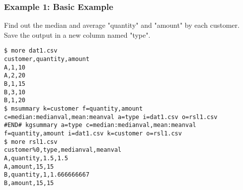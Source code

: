 \subsubsection*{Example 1: Basic Example}

Find out the median and average "quantity" and "amount" by each customer.
Save the output in a new column named "type".


\begin{Verbatim}[baselinestretch=0.7,frame=single]
$ more dat1.csv
customer,quantity,amount
A,1,10
A,2,20
B,1,15
B,3,10
B,1,20
$ msummary k=customer f=quantity,amount c=median:medianval,mean:meanval a=type i=dat1.csv o=rsl1.csv
#END# kgsummary a=type c=median:medianval,mean:meanval f=quantity,amount i=dat1.csv k=customer o=rsl1.csv
$ more rsl1.csv
customer%0,type,medianval,meanval
A,quantity,1.5,1.5
A,amount,15,15
B,quantity,1,1.666666667
B,amount,15,15
\end{Verbatim}
